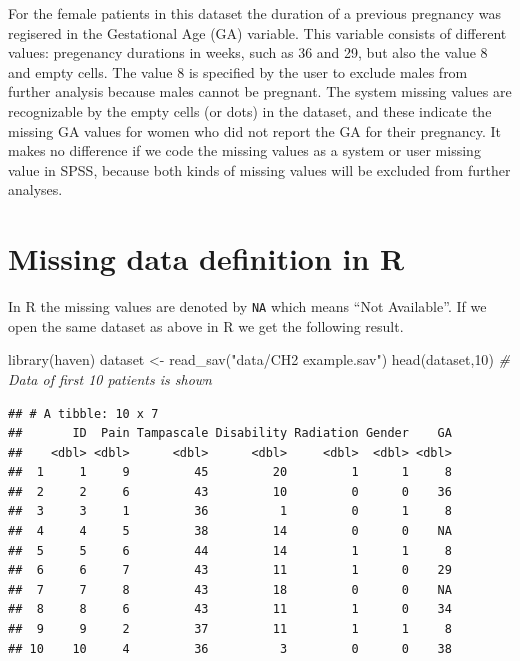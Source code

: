 \documentclass[
]{book}
\newenvironment{Shaded}{\begin{snugshade}}{\end{snugshade}}
\newcommand{\CommentTok}[1]{\textcolor[rgb]{0.56,0.35,0.01}{\textit{#1}}}
\newcommand{\DecValTok}[1]{\textcolor[rgb]{0.00,0.00,0.81}{#1}}
\newcommand{\FunctionTok}[1]{\textcolor[rgb]{0.00,0.00,0.00}{#1}}
\newcommand{\NormalTok}[1]{#1}
\newcommand{\OtherTok}[1]{\textcolor[rgb]{0.56,0.35,0.01}{#1}}
\newcommand{\StringTok}[1]{\textcolor[rgb]{0.31,0.60,0.02}{#1}}
\begin{document}
For the female patients in this dataset the duration of a previous pregnancy was regisered in the Gestational Age (GA) variable. This variable consists of different values: pregenancy durations in weeks, such as 36 and 29, but also the value 8 and empty cells. The value 8 is specified by the user to exclude males from further analysis because males cannot be pregnant. The system missing values are recognizable by the empty cells (or dots) in the dataset, and these indicate the missing GA values for women who did not report the GA for their pregnancy. It makes no difference if we code the missing values as a system or user missing value in SPSS, because both kinds of missing values will be excluded from further analyses.

\hypertarget{missing-data-definition-in-r}{%
\section{Missing data definition in R}\label{missing-data-definition-in-r}}

In R the missing values are denoted by \texttt{NA} which means ``Not Available''. If we open the same dataset as above in R we get the following result.

\begin{Shaded}
\begin{Highlighting}[]
\FunctionTok{library}\NormalTok{(haven)}
\NormalTok{dataset }\OtherTok{\textless{}{-}} \FunctionTok{read\_sav}\NormalTok{(}\StringTok{"data/CH2 example.sav"}\NormalTok{)}
\FunctionTok{head}\NormalTok{(dataset,}\DecValTok{10}\NormalTok{) }\CommentTok{\# Data of first 10 patients is shown}
\end{Highlighting}
\end{Shaded}

\begin{verbatim}
## # A tibble: 10 x 7
##       ID  Pain Tampascale Disability Radiation Gender    GA
##    <dbl> <dbl>      <dbl>      <dbl>     <dbl>  <dbl> <dbl>
##  1     1     9         45         20         1      1     8
##  2     2     6         43         10         0      0    36
##  3     3     1         36          1         0      1     8
##  4     4     5         38         14         0      0    NA
##  5     5     6         44         14         1      1     8
##  6     6     7         43         11         1      0    29
##  7     7     8         43         18         0      0    NA
##  8     8     6         43         11         1      0    34
##  9     9     2         37         11         1      1     8
## 10    10     4         36          3         0      0    38
\end{verbatim}
\end{document}
